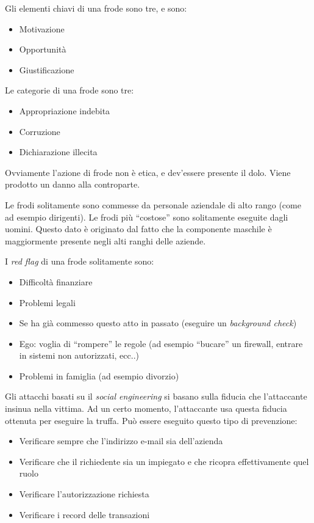 \begin{Answer} [
  ref={fr7},
  number={7}
 ]

 \Question Gli elementi chiavi di una frode sono tre, e sono:
\begin{itemize}
 \item Motivazione
 \item Opportunità
 \item Giustificazione
\end{itemize}

 \Question Le categorie di una frode sono tre:
 \begin{itemize}
  \item Appropriazione indebita
  \item Corruzione
  \item Dichiarazione illecita
 \end{itemize}

 \Question Ovviamente l’azione di frode non è etica, e dev’essere presente il 
dolo. Viene prodotto un danno alla controparte.

 \Question Le frodi solitamente sono commesse da personale aziendale di alto 
rango (come ad esempio dirigenti). Le frodi pi\`u ``costose'' sono solitamente 
eseguite dagli uomini. Questo dato \`e originato dal fatto che la componente 
maschile \`e maggiormente presente negli alti ranghi delle aziende.

 \Question I \textit{red flag} di una frode solitamente sono:
 \begin{itemize}
  \item Difficoltà finanziare
  \item Problemi legali
  \item Se ha già commesso questo atto in passato (eseguire un
  \textit{background check})
  \item Ego: voglia di ``rompere'' le regole (ad esempio ``bucare'' un
  firewall, entrare in sistemi non autorizzati, ecc..)
  \item Problemi in famiglia (ad esempio divorzio)
\end{itemize}

 \Question Gli attacchi basati su il \textit{social engineering} si basano 
sulla fiducia che l'attaccante insinua nella vittima. Ad un certo momento, 
l'attaccante usa questa fiducia ottenuta per eseguire la truffa.
Pu\`o essere eseguito questo tipo di prevenzione:
\begin{itemize}
  \item Verificare sempre che l'indirizzo e-mail sia dell'azienda
  \item Verificare che il richiedente sia un impiegato e che ricopra
  effettivamente quel ruolo
  \item Verificare l'autorizzazione richiesta
  \item Verificare i record delle transazioni
\end{itemize}


\end{Answer}
